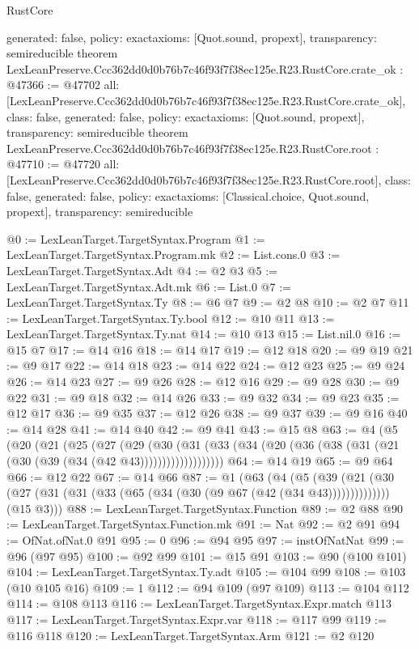 \begin{lexlean}{RustCore}
\begin{coremodule}
{  generated: false,
  policy: exact{axioms: [Quot.sound, propext]},
  transparency: semireducible
}
theorem LexLeanPreserve.Ccc362dd0d0b76b7c46f93f7f38ec125e.R23.RustCore.crate_ok : @47366 := @47702 {
  all: [LexLeanPreserve.Ccc362dd0d0b76b7c46f93f7f38ec125e.R23.RustCore.crate_ok],
  class: false,
  generated: false,
  policy: exact{axioms: [Quot.sound, propext]},
  transparency: semireducible
}
theorem LexLeanPreserve.Ccc362dd0d0b76b7c46f93f7f38ec125e.R23.RustCore.root : @47710 := @47720 {
  all: [LexLeanPreserve.Ccc362dd0d0b76b7c46f93f7f38ec125e.R23.RustCore.root],
  class: false,
  generated: false,
  policy: exact{axioms: [Classical.choice, Quot.sound, propext]},
  transparency: semireducible
}

@0 := LexLeanTarget.TargetSyntax.Program
@1 := LexLeanTarget.TargetSyntax.Program.mk
@2 := List.cons.{0}
@3 := LexLeanTarget.TargetSyntax.Adt
@4 := @2 @3
@5 := LexLeanTarget.TargetSyntax.Adt.mk
@6 := List.{0}
@7 := LexLeanTarget.TargetSyntax.Ty
@8 := @6 @7
@9 := @2 @8
@10 := @2 @7
@11 := LexLeanTarget.TargetSyntax.Ty.bool
@12 := @10 @11
@13 := LexLeanTarget.TargetSyntax.Ty.nat
@14 := @10 @13
@15 := List.nil.{0}
@16 := @15 @7
@17 := @14 @16
@18 := @14 @17
@19 := @12 @18
@20 := @9 @19
@21 := @9 @17
@22 := @14 @18
@23 := @14 @22
@24 := @12 @23
@25 := @9 @24
@26 := @14 @23
@27 := @9 @26
@28 := @12 @16
@29 := @9 @28
@30 := @9 @22
@31 := @9 @18
@32 := @14 @26
@33 := @9 @32
@34 := @9 @23
@35 := @12 @17
@36 := @9 @35
@37 := @12 @26
@38 := @9 @37
@39 := @9 @16
@40 := @14 @28
@41 := @14 @40
@42 := @9 @41
@43 := @15 @8
@63 := @4
    (@5
      (@20
        (@21
          (@25
            (@27
              (@29
                (@30
                  (@31 (@33 (@34 (@20 (@36 (@38 (@31 (@21 (@30 (@39 (@34 (@42 @43)))))))))))))))))))
@64 := @14 @19
@65 := @9 @64
@66 := @12 @22
@67 := @14 @66
@87 := @1
    (@63
      (@4
        (@5 (@39 (@21 (@30 (@27 (@31 (@31 (@33 (@65 (@34 (@30 (@9 @67 (@42 (@34 @43))))))))))))))
        (@15 @3)))
@88 := LexLeanTarget.TargetSyntax.Function
@89 := @2 @88
@90 := LexLeanTarget.TargetSyntax.Function.mk
@91 := Nat
@92 := @2 @91
@94 := OfNat.ofNat.{0} @91
@95 := 0
@96 := @94 @95
@97 := instOfNatNat
@99 := @96 (@97 @95)
@100 := @92 @99
@101 := @15 @91
@103 := @90 (@100 @101)
@104 := LexLeanTarget.TargetSyntax.Ty.adt
@105 := @104 @99
@108 := @103 (@10 @105 @16)
@109 := 1
@112 := @94 @109 (@97 @109)
@113 := @104 @112
@114 := @108 @113
@116 := LexLeanTarget.TargetSyntax.Expr.match @113
@117 := LexLeanTarget.TargetSyntax.Expr.var
@118 := @117 @99
@119 := @116 @118
@120 := LexLeanTarget.TargetSyntax.Arm
@121 := @2 @120

\end{coremodule}
\end{lexlean}
